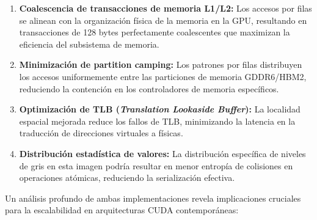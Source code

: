         \begin{enumerate}
            
            \item \textbf{Coalescencia de transacciones de memoria L1/L2:} Los accesos por filas se alinean con la organización física de la memoria en la GPU, resultando en transacciones de 128 bytes perfectamente coalescentes que maximizan la eficiencia del subsistema de memoria.
            
            \item \textbf{Minimización de partition camping:} Los patrones por filas distribuyen los accesos uniformemente entre las particiones de memoria GDDR6/HBM2, reduciendo la contención en los controladores de memoria específicos.
            
            \item \textbf{Optimización de TLB (\textit{Translation Lookaside Buffer}):} La localidad espacial mejorada reduce los fallos de TLB, minimizando la latencia en la traducción de direcciones virtuales a físicas.
            
            \item \textbf{Distribución estadística de valores:} La distribución específica de niveles de gris en esta imagen podría resultar en menor entropía de colisiones en operaciones atómicas, reduciendo la serialización efectiva.
            
        \end{enumerate}
                
        Un análisis profundo de ambas implementaciones revela implicaciones cruciales para la escalabilidad en arquitecturas CUDA contemporáneas:

